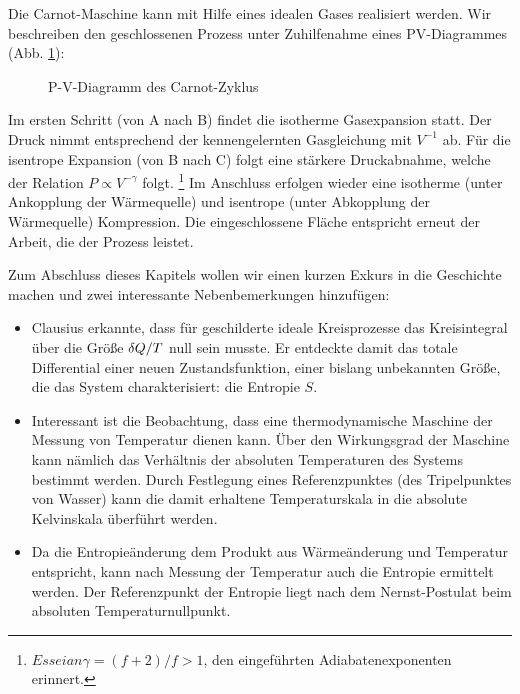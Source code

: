 Die Carnot-Maschine kann mit Hilfe eines idealen Gases realisiert werden.
Wir beschreiben den geschlossenen Prozess unter Zuhilfenahme eines PV-Diagrammes (Abb. \ref{fig:CarnotCyclePVDiagram}):
\begin{figure}[htbp]
    \centering
    \tfigPV
    \caption{P-V-Diagramm des Carnot-Zyklus}
    \label{fig:CarnotCyclePVDiagram}
\end{figure}
Im ersten Schritt (von A nach B) findet die isotherme Gasexpansion statt. Der Druck nimmt entsprechend der kennengelernten Gasgleichung mit $V^{-1}$ ab. Für die isentrope Expansion (von B nach C) folgt eine stärkere Druckabnahme, welche der Relation $P \propto V^{-\gamma}$ folgt. \footnote{$Es sei an \gamma=(f+2)/f>1$, den eingeführten Adiabatenexponenten erinnert.} Im Anschluss erfolgen wieder eine isotherme (unter Ankopplung der Wärmequelle) und isentrope (unter Abkopplung der Wärmequelle) Kompression. Die eingeschlossene Fläche entspricht erneut der Arbeit, die der Prozess leistet. 

Zum Abschluss dieses Kapitels wollen wir einen kurzen Exkurs in die Geschichte machen und zwei interessante Nebenbemerkungen hinzufügen: 

\begin{itemize}
    \item Clausius erkannte, dass für geschilderte ideale Kreisprozesse das Kreisintegral über die Größe $\mathop{}\!\delta Q/T$ null sein musste. Er entdeckte damit das totale Differential einer neuen Zustandsfunktion, einer bislang unbekannten Größe, die das System charakterisiert: die Entropie $S$.  
    \item Interessant ist die Beobachtung, dass eine thermodynamische Maschine der Messung von Temperatur dienen kann. 
    Über den Wirkungsgrad der Maschine kann nämlich das Verhältnis der absoluten Temperaturen des Systems bestimmt werden. Durch Festlegung eines Referenzpunktes (des Tripelpunktes von Wasser) kann die damit erhaltene Temperaturskala in die absolute Kelvinskala überführt werden.
    \item Da die Entropieänderung dem Produkt aus Wärmeänderung und Temperatur entspricht, kann nach Messung der Temperatur auch die Entropie ermittelt werden. Der Referenzpunkt der Entropie liegt nach dem Nernst-Postulat beim absoluten Temperaturnullpunkt.
\end{itemize}







